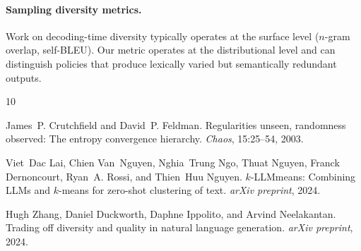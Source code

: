 \documentclass[11pt]{article}
\begin{document}
\paragraph{Sampling diversity metrics.} Work on decoding-time diversity \citep{zhang2024writingprompts} typically operates at the surface level ($n$-gram overlap, self-BLEU). Our metric operates at the distributional level and can distinguish policies that produce lexically varied but semantically redundant outputs.



\begin{thebibliography}{10}

James~P. Crutchfield and David~P. Feldman.
\newblock Regularities unseen, randomness observed: The entropy convergence
  hierarchy.
\newblock \emph{Chaos}, 15:25--54, 2003.

Viet~Dac Lai, Chien Van~Nguyen, Nghia~Trung Ngo, Thuat Nguyen, Franck Dernoncourt, Ryan~A. Rossi, and Thien~Huu Nguyen.
\newblock $k$-LLMmeans: Combining LLMs and $k$-means for zero-shot clustering of text.
\newblock \emph{arXiv preprint}, 2024.

Hugh Zhang, Daniel Duckworth, Daphne Ippolito, and Arvind Neelakantan.
\newblock Trading off diversity and quality in natural language generation.
\newblock \emph{arXiv preprint}, 2024.

\end{thebibliography}
\end{document}
